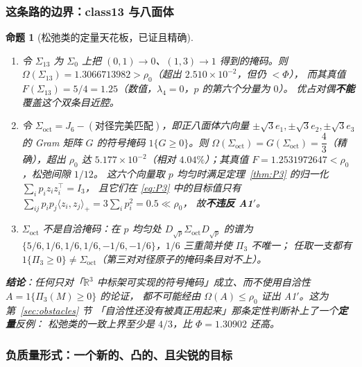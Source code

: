 \documentclass[UTF8,11pt]{ctexart}
\newtheorem{proposition}[theorem]{命题}
\theoremstyle{definition}
\newcommand{\R}{\mathbb{R}}
\begin{document}
\subsubsection*{这条路的边界：class13 与八面体}

\begin{proposition}[松弛类的定量天花板，已证且精确]\label{prop:octnogo}
\begin{enumerate}[label=(\alph*),leftmargin=2em,itemsep=2pt]
\item 令 $\Sigma_{13}$ 为 $\Sigma_0$ 上把 $(0,1)\to0$、$(1,3)\to1$ 得到的掩码。则
      $\Omega(\Sigma_{13})=1.3066713982>\rho_0$（超出 $2.510\times10^{-2}$，但仍 $<\Phi$），
      而其真值 $F(\Sigma_{13})=5/4=1.25$（数值，$\lambda_4=0$，$p$ 的第六个分量为 $0$）。
      优占对偶\textbf{不能}覆盖这个双条目近腔。
\item 令 $\Sigma_{\mathrm{oct}}=J_6-(\text{对径完美匹配})$，即正八面体六向量
      $\pm\sqrt3e_1,\pm\sqrt3e_2,\pm\sqrt3e_3$ 的 Gram 矩阵 $G$ 的符号掩码 $1\{G\ge0\}$。则
      $\Omega(\Sigma_{\mathrm{oct}})=G(\Sigma_{\mathrm{oct}})=\dfrac43$（精确），超出 $\rho_0$ 达
      $5.177\times10^{-2}$（相对 $4.04\%$）；其真值 $F=1.2531972647<\rho_0$，松弛间隙 $1/12$。
      这六个向量取 $p$ 均匀时满足定理~\ref{thm:P3} 的归一化 $\sum_ip_iz_iz_i^\top=I_3$，
      且它们在 \eqref{eq:P3} 中的目标值只有 $\sum_{ij}p_ip_j\langle z_i,z_j\rangle_+=3\sum_ip_i^2=0.5\ll\rho_0$，
      故\textbf{不违反 A1$'$}。
\item $\Sigma_{\mathrm{oct}}$ 不是自洽掩码：在 $p$ 均匀处 $D_{\sqrt p}\Sigma_{\mathrm{oct}}D_{\sqrt p}$ 的谱为
      $\{5/6,1/6,1/6,1/6,-1/6,-1/6\}$，$1/6$ 三重简并使 $\Pi_3$ 不唯一；
      任取一支都有 $1\{\Pi_3\ge0\}\ne\Sigma_{\mathrm{oct}}$（第三对对径原子的掩码条目对不上）。
\end{enumerate}
\textbf{结论}：任何只对「$\R^3$ 中标架可实现的符号掩码」成立、而不使用自洽性 $A=1\{\Pi_3(M)\ge0\}$ 的论证，
都不可能经由 $\Omega(A)\le\rho_0$ 证出 A1$'$。这为第~\ref{sec:obstacles} 节
「自洽性还没有被真正用起来」那条定性判断补上了一个\textbf{定量}反例：
松弛类的一致上界至少是 $4/3$，比 $\Phi=1.30902$ 还高。
\end{proposition}

\subsubsection*{负质量形式：一个新的、凸的、且尖锐的目标}
\end{document}
